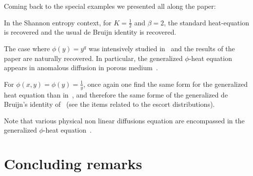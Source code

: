 \documentclass[entropy,article,submit,moreauthors,pdftex]{Definitions/mdpi}
\newcounter{GaussExample}%
\newcounter{qGaussExample}%
\newcounter{arcsineExample}%
\begin{document}
Coming back to the special examples we presented all along the paper:
%
\begin{Example}
  In  the Shannon  entropy context,  for  $K =  \frac12$  and $\beta  = 2$,  the
  standard  heat-equation is  recovered  and  the usual  de  Bruijn identity  is
  recovered.
\end{Example}
%
\begin{Example}
  The case where $\phi(y) =  y^q$ was intensively studied in~\cite{Ber13:08} and
  the  results  of  the  paper  are naturally  recovered.   In  particular,  the
  generalized  $\phi$-heat equation  appears  in anomalous  diffusion in  porous
  medium~\cite{TsaLen02, Ber13:08, Vaz06}.
\end{Example}
%
\begin{Example}
  For $\phi(x,y) = \phi(y) = \frac{1}{y}$, once again one find the same form for
  the generalized  heat equation  than in~\cite{TsaLen02, Ber13:08,  Vaz06}, and
  therefore   the  same   forme  of   the  generalized   de  Bruijn's   identity
  of~\cite{Ber13:08} (see the items related to the escort distributions).
\end{Example}

Note that various physical non linear diffusions equation are encompassed in the
generalized $\phi$-heat equation~\cite{GilKer04, Vaz06}.




\section{Concluding remarks}
\label{sec:Conclusion}
\end{document}
